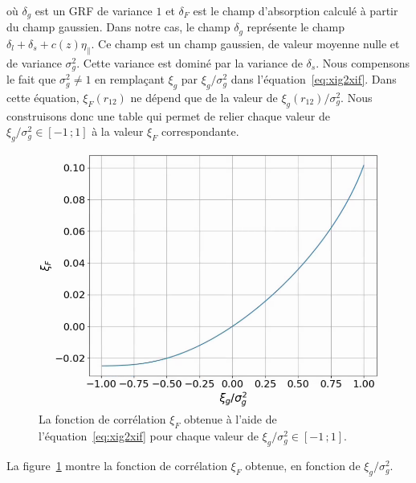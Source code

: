 où $\delta_g$ est un GRF de variance $1$ et $\delta_F$ est le champ d'absorption calculé à partir du champ gaussien.
Dans notre cas, le champ $\delta_g$ représente le champ $\delta_l + \delta_s + c(z)\eta_{\parallel}$. Ce champ est un champ gaussien, de valeur moyenne nulle et de variance $\sigma_g^2$. Cette variance est dominé par la variance de $\delta_s$.
Nous compensons le fait que $\sigma_g^2 \neq 1$ en remplaçant $\xi_g$ par $\xi_g / \sigma_g^2$ dans l'équation~\ref{eq:xig2xif}. %
Dans cette équation, $\xi_F(r_{12})$ ne dépend que de la valeur de $\xi_g(r_{12})/ \sigma_g^2$. Nous construisons donc une table qui permet de relier chaque valeur de $\xi_g/ \sigma_g^2 \in [-1 \, ; 1]$ à la valeur $\xi_F$ correspondante.
\begin{figure}
  \centering
  \includegraphics[scale=0.4]{xiF_vs_xig}
  \caption{La fonction de corrélation $\xi_F$ obtenue à l'aide de l'équation~\ref{eq:xig2xif} pour chaque valeur de $\xi_g/ \sigma_g^2 \in [-1 \, ; 1]$.}
  \label{fig:xiF_vs_xig}
\end{figure}
La figure~\ref{fig:xiF_vs_xig} montre la fonction de corrélation $\xi_F$ obtenue, en fonction de $\xi_g/ \sigma_g^2$.
